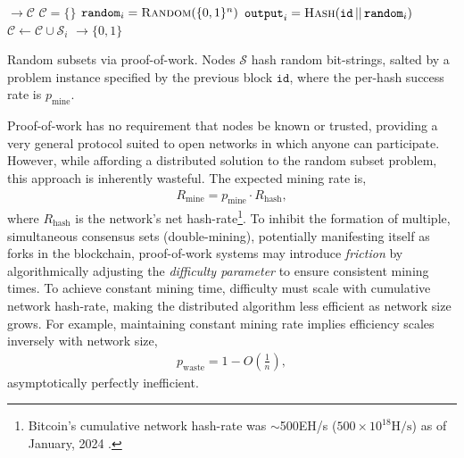 \begin{algorithm}[H]
	\begin{algorithmic}
		 $\to \mathcal{C}$
		\State $\mathcal{C} = \{\}$ 
		 
		\State $\mathtt{random}_i = \textsc{Random}(\{0,1\}^n)$
		\State $\mathtt{output}_i = \textsc{Hash}(\mathtt{id}\,||\,\mathtt{random}_i)$
		\State $\mathcal{C} \gets \mathcal{C} \cup \mathcal{S}_i$
		\EndIf
		\EndFor
		\EndWhile
		\State {}
		\EndFunction
		\State
		 $\to \{0,1\}$
		\State {}
		\Else
		\State {}
		\EndIf
		\EndFunction
	\end{algorithmic}
	\caption{Random subsets via proof-of-work. Nodes $\mathcal{S}$ hash random bit-strings, salted by a problem instance specified by the previous block $\mathtt{id}$, where the per-hash success rate is $p_\mathrm{mine}$.} \label{alg:PoW}
\end{algorithm}

Proof-of-work has no requirement that nodes be known or trusted, providing a very general protocol suited to open networks in which anyone can participate. However, while affording a distributed solution to the random subset problem, this approach is inherently wasteful. The expected mining rate is,
\begin{align}
	R_\mathrm{mine} = p_\mathrm{mine}\cdot R_\mathrm{hash},
\end{align}
where $R_\mathrm{hash}$ is the network's net hash-rate\footnote{Bitcoin's cumulative network hash-rate was $\sim$500EH/s \mbox{($500\times 10^{18}\mathrm{H/s}$)} as of January, 2024 \cite{hash_rate}.}. To inhibit the formation of multiple, simultaneous consensus sets (double-mining), potentially manifesting itself as forks in the blockchain, proof-of-work systems may introduce \emph{friction} by algorithmically adjusting the \emph{difficulty parameter} to ensure consistent mining times. To achieve constant mining time, difficulty must scale with cumulative network hash-rate, making the distributed algorithm less efficient as network size grows. For example, maintaining constant mining rate implies efficiency scales inversely with network size,
\begin{align}
	p_\mathrm{waste}=1-O\left(\frac{1}{n}\right),
\end{align}
asymptotically perfectly inefficient.

